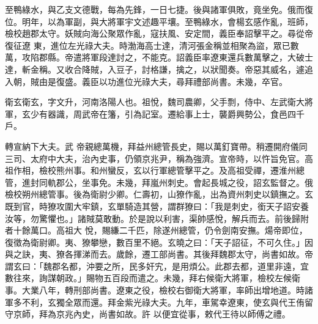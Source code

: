 \begin{pinyinscope}
 至鴨綠水，與乙支文德戰，每為先鋒，一日七捷。後與諸軍俱敗，竟坐免。俄而復位。明年，以為軍副，與大將軍宇文述趣平壤。至鴨綠水，會楊玄感作亂，班師，檢校趙郡太守。妖賊向海公聚眾作亂，寇扶風、安定間，義臣奉詔擊平之。尋從帝復征遼
 東，進位左光祿大夫。時渤海高士達，清河張金稱並相聚為盜，眾已數萬，攻陷郡縣。帝遣將軍段達討之，不能克。詔義臣率遼東還兵數萬擊之，大破士達，斬金稱。又收合降賊，入豆子，討格謙，擒之，以狀聞奏。帝惡其威名，遽追入朝，賊由是復盛。義臣以功進位光祿大夫，尋拜禮部尚書。未幾，卒官。



 衛玄衛玄，字文升，河南洛陽人也。祖悅，魏司農卿，父手剽，侍中、左武衛大將軍，玄少有器識，周武帝在籓，引為記室。遷給事上士，襲爵興勢公，食邑四千戶。



 轉宣納下大夫。武
 帝親總萬機，拜益州總管長史，賜以萬釘寶帶。稍遷開府儀同三司、太府中大夫，治內史事，仍領京兆尹，稱為強濟。宣帝時，以忤旨免官。高祖作相，檢校熊州事。和州蠻反，玄以行軍總管擊平之。及高祖受禪，遷淮州總管，進封同軌郡公，坐事免。未幾，拜嵐州刺史。會起長城之役，詔玄監督之。俄檢校朔州總管事。後為衛尉少卿。仁壽初，山獠作亂，出為資州刺史以鎮撫之。玄既到官，時獠攻圍大牢鎮，玄單騎造其營，謂群獠曰：「我是刺史，銜天子詔安養汝等，勿驚懼也。」諸賊莫敢動。於是說以利害，渠帥感悅，解兵而去。前後歸附者十餘萬口。高祖大
 悅，賜縑二千匹，除遂州總管，仍令劍南安撫。煬帝即位，復徵為衛尉卿。夷、獠攀戀，數百里不絕。玄曉之曰：「天子詔征，不可久住。」因與之訣，夷、獠各揮涕而去。歲餘，遷工部尚書。其後拜魏郡太守，尚書如故。帝謂玄曰：「魏郡名都，沖要之所，民多奸宄，是用煩公。此郡去都，道里非遠，宜數往來，詢謀朝政。」賜物五百段而遣之。未幾，拜右候衛大將軍，檢校左候衛事。大業八年，轉刑部尚書。遼東之役，檢校右御衛大將軍，率師出增地道。時諸軍多不利，玄獨全眾而還。拜金紫光祿大夫。九年，車駕幸遼東，使玄與代王侑留守京師，拜為京兆內史，尚書如故。許
 以便宜從事，敕代王待以師傅之禮。




\end{pinyinscope}
